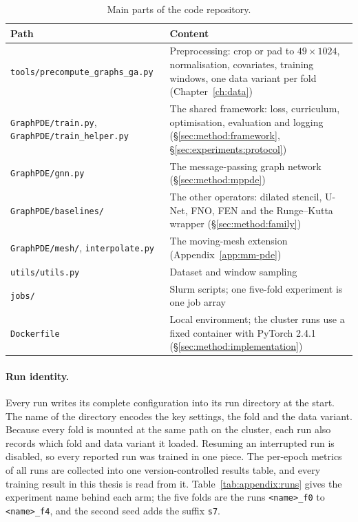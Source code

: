 \begin{table}[h]
  \centering
  \caption[Main parts of the code repository.]{%
    Main parts of the code repository.}
  \label{tab:appendix:repo}
  \small
  \begin{tabular}{p{} p{}}
    \toprule
    Path & Content \\
    \midrule
    \texttt{tools/precompute\_graphs\_ga.py} & Preprocessing: crop or pad
      to $49 \times 1024$, normalisation, covariates, training windows,
      one data variant per fold (Chapter~\ref{ch:data}) \\
    \texttt{GraphPDE/train.py},
    \texttt{GraphPDE/train\_helper.py} & The shared framework: loss,
      curriculum, optimisation, evaluation and logging
      (\S\ref{sec:method:framework}, \S\ref{sec:experiments:protocol}) \\
    \texttt{GraphPDE/gnn.py} & The message-passing graph network
      (\S\ref{sec:method:mppde}) \\
    \texttt{GraphPDE/baselines/} & The other operators: dilated stencil,
      U-Net, FNO, FEN and the Runge--Kutta wrapper
      (\S\ref{sec:method:family}) \\
    \texttt{GraphPDE/mesh/}, \texttt{interpolate.py} & The moving-mesh
      extension (Appendix~\ref{app:mm-pde}) \\
    \texttt{utils/utils.py} & Dataset and window sampling \\
    \texttt{jobs/} & Slurm scripts; one five-fold experiment is one job
      array \\
    \texttt{Dockerfile} & Local environment; the cluster runs use a fixed
      container with PyTorch 2.4.1 (\S\ref{sec:method:implementation}) \\
    \bottomrule
  \end{tabular}
\end{table}

\paragraph{Run identity.}
Every run writes its complete configuration into its run directory at the
start. The name of the directory encodes the key settings, the fold and the
data variant. Because every fold is mounted at the same path on the cluster,
each run also records which fold and data variant it loaded. Resuming an
interrupted run is disabled, so every reported run was trained in one
piece. The per-epoch metrics of all runs are collected into one
version-controlled results table, and every training result in this thesis
is read from it. Table~\ref{tab:appendix:runs} gives the experiment name
behind each arm; the five folds are the runs \texttt{<name>\_f0} to
\texttt{<name>\_f4}, and the second seed adds the suffix \texttt{s7}.

